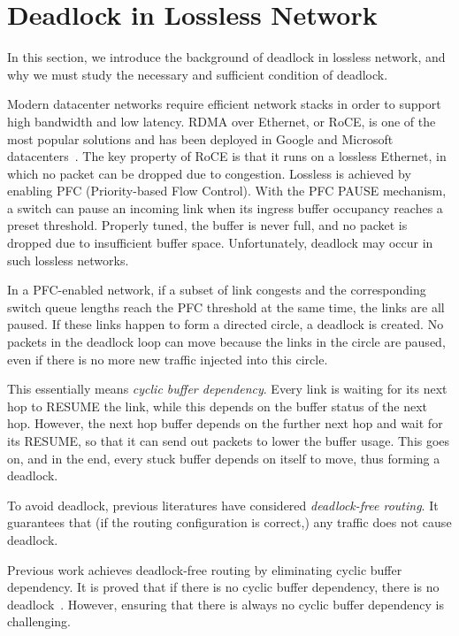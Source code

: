 \secspace
\section{Deadlock in Lossless Network}
\secspace

In this section, we introduce the background of deadlock in lossless network,
and why we must study the necessary and sufficient condition of deadlock.

Modern datacenter networks require efficient network stacks in order to support
high bandwidth and low latency. RDMA over Ethernet, or RoCE, is one of the most
popular solutions and has been deployed in Google and Microsoft
datacenters~\cite{dcqcn, timely}.  The key property of RoCE is that it runs on a
lossless Ethernet, in which no packet can be dropped due to congestion.
Lossless is achieved by enabling PFC (Priority-based Flow Control). With the PFC
PAUSE mechanism, a switch can pause an incoming link when its ingress buffer
occupancy reaches a preset threshold. Properly tuned, the buffer is never full,
and no packet is dropped due to insufficient buffer space.  Unfortunately,
deadlock may occur in such lossless networks.

In a PFC-enabled network, if a subset of link congests and the corresponding
switch queue lengths reach the PFC threshold at the same time, the links are all
paused. If these links happen to form a directed circle, a deadlock is created.
No packets in the deadlock loop can move because the links in the circle are
paused, even if there is no more new traffic injected into this circle.

This essentially means {\em cyclic buffer dependency}. Every link is waiting for
its next hop to RESUME the link, while this depends on the buffer status of the
next hop. However, the next hop buffer depends on the further next hop and wait
for its RESUME, so that it can send out packets to lower the buffer usage. This
goes on, and in the end, every stuck buffer depends on itself to move, thus
forming a deadlock.

To avoid deadlock, previous literatures have considered {\em deadlock-free
routing}. It guarantees that (if the routing configuration is correct,) any
traffic does not cause deadlock.

 Previous work achieves deadlock-free routing by eliminating
cyclic buffer dependency.  It is proved that if there is no cyclic buffer
dependency, there is no deadlock~\cite{deadlockfree}.  However, ensuring that
there is always no cyclic buffer dependency is challenging.

